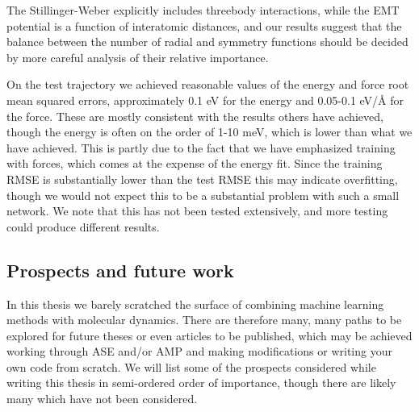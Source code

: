 The Stillinger-Weber explicitly includes threebody interactions,
while the EMT potential is a function of interatomic distances, and our
results suggest that the balance between the number of radial and symmetry functions
should be decided by more careful analysis of their relative importance.
\par
On the test trajectory we achieved reasonable values of the energy and force
root mean squared errors, approximately 0.1 eV for the energy and 0.05-0.1 eV/Å
for the force. These are mostly consistent with the results others have achieved,
though the energy is often on the order of 1-10 meV, which is lower than
what we have achieved. This is partly due to the fact that we have emphasized
training with forces, which comes at the expense of the energy fit.
Since the training RMSE is substantially lower than the test RMSE this may
indicate overfitting, though we would not expect this to be a substantial problem
with such a small network. We note that this has not been tested extensively,
and more testing could produce different results.

\subsection{Prospects and future work}
In this thesis we barely scratched the surface of combining machine learning
methods with molecular dynamics. There are therefore many, many paths
to be explored for future theses or even articles to be published,
which may be achieved working through ASE and/or AMP and making modifications
or writing your own code from scratch. We will list some of the prospects
considered while writing this thesis in semi-ordered order of importance,
though there are likely many which have not been considered.

